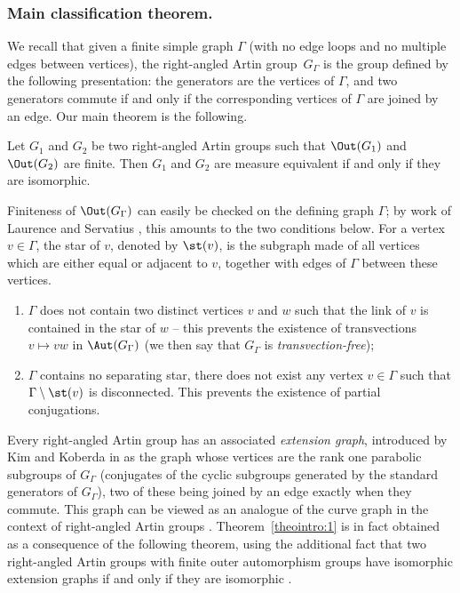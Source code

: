 \subsubsection*{Main classification theorem.} We recall that given a finite simple graph $\Gamma$ (\ie with no edge loops and no multiple edges between vertices), the right-angled Artin group~$G_\Gamma$ is the group defined by the following presentation: the generators are the vertices of $\Gamma$, and two generators commute if and only if the corresponding vertices of $\Gamma$ are joined by an edge. Our main theorem is the following.

\begin{theointro}\label{theointro:1}
Let $G_1$ and $G_2$ be two right-angled Artin groups such that $\Out(G_1)$ and $\Out(G_2)$ are finite. Then $G_1$ and $G_2$ are measure equivalent if and only if they are isomorphic.
\end{theointro}

Finiteness of $\Out(G_\Gamma)$ can easily be checked on the defining graph $\Gamma$; by work of Laurence \cite{laurence1995generating} and Servatius \cite{Ser}, this amounts to the two conditions below. For a vertex $v\in\Gamma$, the star of $v$, denoted by $\st(v)$, is the subgraph made of all vertices which are either equal or adjacent to $v$, together with edges of $\Gamma$ between these vertices.
\begin{enumerate}
\item $\Gamma$ does not contain two distinct vertices $v$ and $w$ such that the link of $v$ is contained in the star of $w$ -- this prevents the existence of transvections $v\mapsto vw$ in $\Aut(G_\Gamma)$ (we then say that $G_\Gamma$ is \emph{transvection-free});
\item $\Gamma$ contains no separating star, \ie there does not exist any vertex $v\in\Gamma$ such that $\Gamma\setminus \st(v)$ is disconnected. This prevents the existence of partial conjugations.
\end{enumerate}

Every right-angled Artin group has an associated \emph{extension graph}, introduced by Kim and Koberda in \cite{kim2013embedability} as the graph whose vertices are the rank one parabolic subgroups of $G_\Gamma$ (\ie conjugates of the cyclic subgroups generated by the standard generators of $G_\Gamma$), two of these being joined by an edge exactly when they commute. This graph can be viewed as an analogue of the curve graph in the context of right-angled Artin groups \cite{kim2014geometry}. Theorem~\ref{theointro:1} is in fact obtained as a consequence of the following theorem, using the additional fact that two right-angled Artin groups with finite outer automorphism groups have isomorphic extension graphs if and only if they are isomorphic \cite{Hua}.

